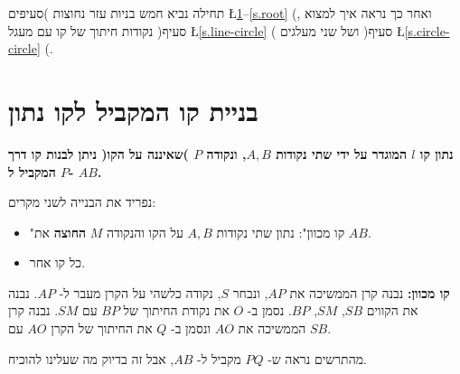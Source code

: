 

תחילה נביא חמש בניות עזר נחוצות )סעיפים
\L{\ref{s.parallel}--\ref{s.root}}%
(,
ואחר כך נראה איך למצוא נקודות חיתוך של קו עם מעגל )סעיף
\L{\ref{s.line-circle}}%
( ושל שני מעלגים )סעיף
\L{\ref{s.circle-circle}}%
(.

\section{%
בניית קו המקביל לקו נתון%
}\label{s.parallel}

\textbf{%
נתון קו
$l$
המוגדר על ידי שתי נקודות
$A,B$,
ונקודה 
$P$
)שאיננה על הקו( ניתן לבנות קו דרך
$P$
המקביל ל-
$AB$.%
}

נפריד את הבנייה לשני מקרים:
\begin{itemize}
\item
"קו מכוון": נתון שתי נקודות
$A,B$
על הקו והנקודה 
$M$
\textbf{%
החוצה
}
את
$AB$.
\item
כל קו אחר.
\end{itemize}

\textbf{%
קו מכוון:
}
נבנה קרן הממשיכה את
$AP$,
ונבחר
$S$,
נקודה כלשהי על הקרן מעבר ל-%
$AP$.
נבנה את הקווים
$SB$, $SM$, $BP$.
נסמן ב-%
$O$
את נקודת החיתוך של 
$BP$
עם
$SM$.
נבנה קרן הממשיכה את
$AO$
ונסמן ב-%
$Q$
את החיתוך של הקרן
$AO$
עם
$SB$.
\begin{center}
\vspace*{-4pt}
\vspace*{-4pt}
\end{center}
מהתרשים נראה ש-%
$PQ$
מקביל ל-%
$AB$,
אבל זה בדיוק מה שעלינו להוכיח.

